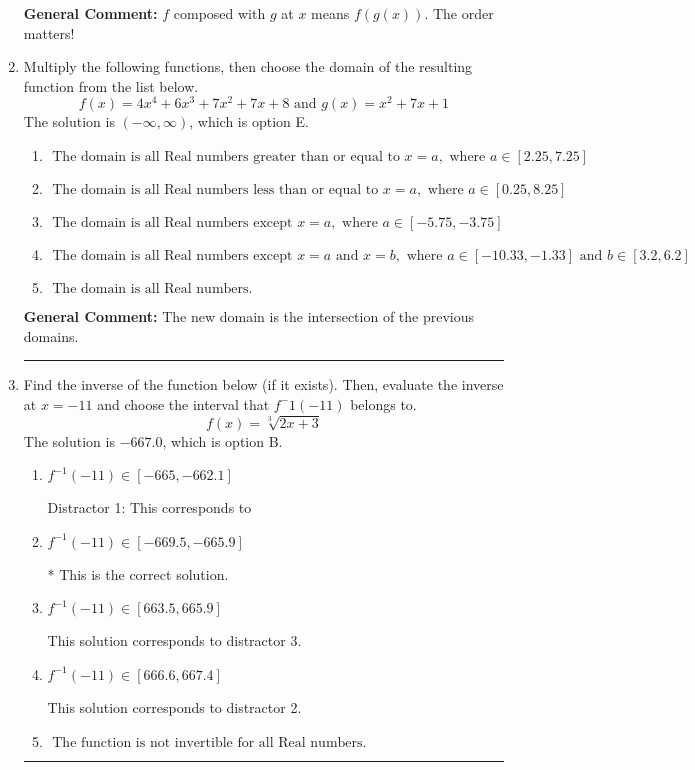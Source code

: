 \documentclass{extbook}[14pt]
\newcommand{\litem}[1]{\item #1

\rule{\textwidth}{0.4pt}}
\begin{document}
\begin{enumerate}
{\begin{enumerate}[label=\Alph*.]
\end{enumerate}

\textbf{General Comment:} $f$ composed with $g$ at $x$ means $f(g(x))$. The order matters!
}
\litem{
Multiply the following functions, then choose the domain of the resulting function from the list below.
\[ f(x) = 4x^{4} +6 x^{3} +7 x^{2} +7 x + 8 \text{ and } g(x) = x^{2} +7 x + 1 \]The solution is \( (-\infty, \infty) \), which is option E.\begin{enumerate}[label=\Alph*.]
\item \( \text{ The domain is all Real numbers greater than or equal to } x = a, \text{ where } a \in [2.25, 7.25] \)


\item \( \text{ The domain is all Real numbers less than or equal to } x = a, \text{ where } a \in [0.25, 8.25] \)


\item \( \text{ The domain is all Real numbers except } x = a, \text{ where } a \in [-5.75, -3.75] \)


\item \( \text{ The domain is all Real numbers except } x = a \text{ and } x = b, \text{ where } a \in [-10.33, -1.33] \text{ and } b \in [3.2, 6.2] \)


\item \( \text{ The domain is all Real numbers. } \)


\end{enumerate}

\textbf{General Comment:} The new domain is the intersection of the previous domains.
}
\litem{
Find the inverse of the function below (if it exists). Then, evaluate the inverse at $x = -11$ and choose the interval that $f^-1(-11)$ belongs to.
\[ f(x) = \sqrt[3]{2 x + 3} \]The solution is \( -667.0 \), which is option B.\begin{enumerate}[label=\Alph*.]
\item \( f^{-1}(-11) \in [-665, -662.1] \)

 Distractor 1: This corresponds to 
\item \( f^{-1}(-11) \in [-669.5, -665.9] \)

* This is the correct solution.
\item \( f^{-1}(-11) \in [663.5, 665.9] \)

 This solution corresponds to distractor 3.
\item \( f^{-1}(-11) \in [666.6, 667.4] \)

 This solution corresponds to distractor 2.
\item \( \text{ The function is not invertible for all Real numbers. } \)


\end{enumerate}}
\end{enumerate}
\end{document}

